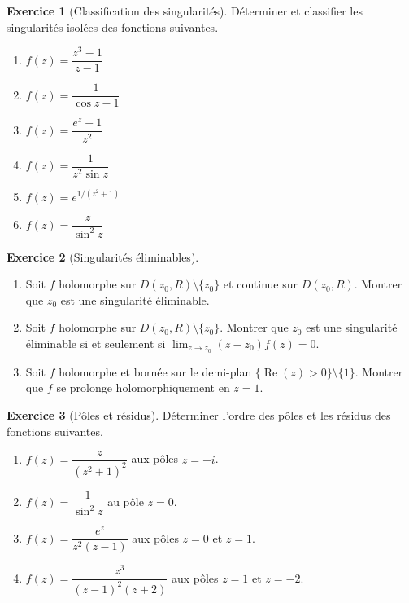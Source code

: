 \documentclass[12pt,a4paper,openany]{book}
\theoremstyle{definition}
\newtheorem{exercice}{Exercice}[chapter]
\theoremstyle{plain}
\theoremstyle{remark}
\DeclareMathOperator{\re}{Re}
\begin{document}
\begin{exercice}[Classification des singularités]\label{exo:classify-sing}
Déterminer et classifier les singularités isolées des fonctions suivantes.
\begin{enumerate}[label=\textbf{\alph*)}]
  \item $f(z) = \dfrac{z^3 - 1}{z - 1}$
  \item $f(z) = \dfrac{1}{\cos z - 1}$
  \item $f(z) = \dfrac{e^z - 1}{z^2}$
  \item $f(z) = \dfrac{1}{z^2\sin z}$
  \item $f(z) = e^{1/(z^2+1)}$
  \item $f(z) = \dfrac{z}{\sin^2 z}$
\end{enumerate}
\end{exercice}

\begin{exercice}[Singularités éliminables]\label{exo:removable}
\begin{enumerate}[label=\textbf{\alph*)}]
  \item Soit $f$ holomorphe sur $D(z_0,R)\setminus\{z_0\}$ et continue
        sur $D(z_0,R)$. Montrer que $z_0$ est une singularité éliminable.
  \item Soit $f$ holomorphe sur $D(z_0,R)\setminus\{z_0\}$. Montrer
        que $z_0$ est une singularité éliminable si et seulement si
        $\lim_{z \to z_0}(z - z_0)f(z) = 0$.
  \item Soit $f$ holomorphe et bornée sur le demi-plan
        $\{\re(z) > 0\}\setminus\{1\}$. Montrer que $f$ se prolonge
        holomorphiquement en $z = 1$.
\end{enumerate}
\end{exercice}

\begin{exercice}[Pôles et résidus]\label{exo:poles-residues}
Déterminer l'ordre des pôles et les résidus des fonctions suivantes.
\begin{enumerate}[label=\textbf{\alph*)}]
  \item $f(z) = \dfrac{z}{(z^2+1)^2}$ aux pôles $z = \pm i$.
  \item $f(z) = \dfrac{1}{\sin^2 z}$ au pôle $z = 0$.
  \item $f(z) = \dfrac{e^z}{z^2(z-1)}$ aux pôles $z = 0$ et $z = 1$.
  \item $f(z) = \dfrac{z^3}{(z-1)^2(z+2)}$ aux pôles $z = 1$ et $z = -2$.
\end{enumerate}
\end{exercice}
\end{document}
